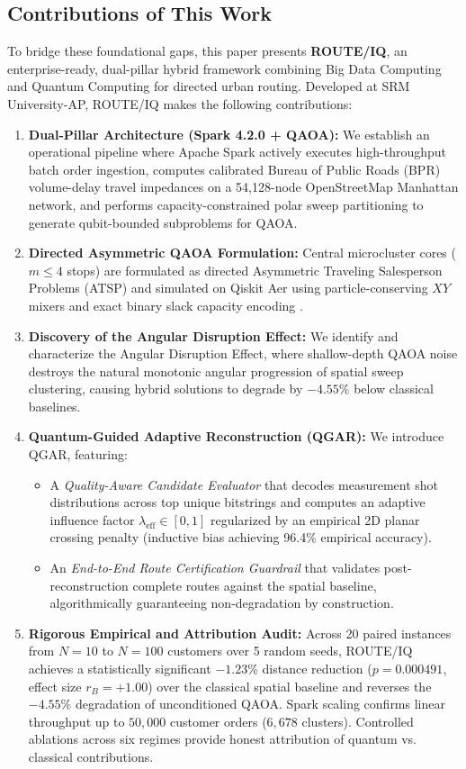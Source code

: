 \documentclass[journal,10pt]{IEEEtran}
\begin{document}
\subsection{Contributions of This Work}
To bridge these foundational gaps, this paper presents \textbf{ROUTE/IQ}, an enterprise-ready, dual-pillar hybrid framework combining Big Data Computing and Quantum Computing for directed urban routing. Developed at SRM University-AP, ROUTE/IQ makes the following contributions:
\begin{enumerate}
    \item \textbf{Dual-Pillar Architecture (Spark 4.2.0 + QAOA):} We establish an operational pipeline where Apache Spark actively executes high-throughput batch order ingestion, computes calibrated Bureau of Public Roads (BPR) volume-delay travel impedances on a 54,128-node OpenStreetMap Manhattan network, and performs capacity-constrained polar sweep partitioning \cite{gillett1974sweep} to generate qubit-bounded subproblems for QAOA.
    \item \textbf{Directed Asymmetric QAOA Formulation:} Central microcluster cores ($m \le 4$ stops) are formulated as directed Asymmetric Traveling Salesperson Problems (ATSP) and simulated on Qiskit Aer using particle-conserving $XY$ mixers \cite{hadfield2019qaoa, wang2020xy} and exact binary slack capacity encoding \cite{harwood2021formulating}.
    \item \textbf{Discovery of the Angular Disruption Effect:} We identify and characterize the Angular Disruption Effect, where shallow-depth QAOA noise destroys the natural monotonic angular progression of spatial sweep clustering, causing hybrid solutions to degrade by $-4.55\%$ below classical baselines.
    \item \textbf{Quantum-Guided Adaptive Reconstruction (QGAR):} We introduce QGAR, featuring:
    \begin{itemize}
        \item A \textit{Quality-Aware Candidate Evaluator} that decodes measurement shot distributions across top unique bitstrings and computes an adaptive influence factor $\lambda_{\text{eff}} \in [0, 1]$ regularized by an empirical 2D planar crossing penalty (inductive bias achieving 96.4\% empirical accuracy).
        \item An \textit{End-to-End Route Certification Guardrail} that validates post-reconstruction complete routes against the spatial baseline, algorithmically guaranteeing non-degradation by construction.
    \end{itemize}
    \item \textbf{Rigorous Empirical and Attribution Audit:} Across 20 paired instances from $N=10$ to $N=100$ customers over 5 random seeds, ROUTE/IQ achieves a statistically significant $-1.23\%$ distance reduction ($p = 0.000491$, effect size $r_B = +1.00$) over the classical spatial baseline and reverses the $-4.55\%$ degradation of unconditioned QAOA. Spark scaling confirms linear throughput up to $50,000$ customer orders ($6,678$ clusters). Controlled ablations across six regimes provide honest attribution of quantum vs. classical contributions.
\end{enumerate}
\end{document}
